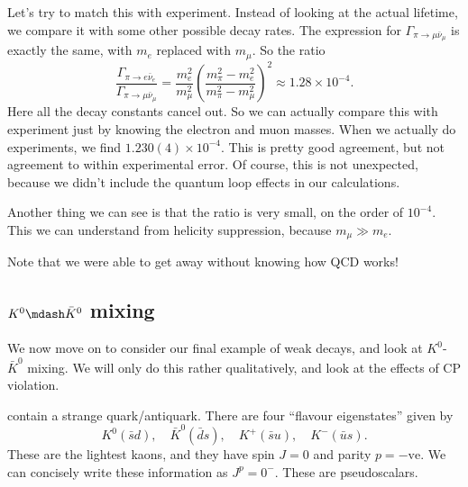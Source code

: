 \documentclass[a4paper]{article}
\begin{document}
Let's try to match this with experiment. Instead of looking at the actual lifetime, we compare it with some other possible decay rates. The expression for $\Gamma_{\pi \to \mu \bar{\nu}_\mu}$ is exactly the same, with $m_e$ replaced with $m_\mu$. So the ratio
\[
  \frac{\Gamma_{\pi \to e\bar{\nu}_e}}{\Gamma_{\pi \to \mu \bar{\nu}_\mu}} = \frac{m_e^2}{m_\mu^2} \left(\frac{m_\pi^2 - m_e^2}{m_\pi^2 - m_\mu^2}\right)^2 \approx 1.28 \times 10^{-4}.
\]
Here all the decay constants cancel out. So we can actually compare this with experiment just by knowing the electron and muon masses. When we actually do experiments, we find $1.230(4) \times 10^{-4}$. This is pretty good agreement, but not agreement to within experimental error. Of course, this is not unexpected, because we didn't include the quantum loop effects in our calculations.

Another thing we can see is that the ratio is very small, on the order of $10^{-4}$. This we can understand from helicity suppression, because $m_\mu \gg m_e$.

Note that we were able to get away without knowing how QCD works!

\subsection{\texorpdfstring{$K^0\mdash \bar{K}^0$}{K0-K0} mixing}
We now move on to consider our final example of weak decays, and look at $K^0$-$\bar{K}^0$ mixing. We will only do this rather qualitatively, and look at the effects of CP violation.

 contain a strange quark/antiquark. There are four ``flavour eigenstates'' given by
\[
  K^0 (\bar{s} d),\quad \bar{K}^0 (\bar{d} s),\quad K^+(\bar{s} u),\quad K^-(\bar{u} s).
\]
These are the lightest kaons, and they have spin $J = 0$ and parity $p = -\mathrm{ve}$. We can concisely write these information as $J^p = 0^-$. These are pseudoscalars.
\end{document}
